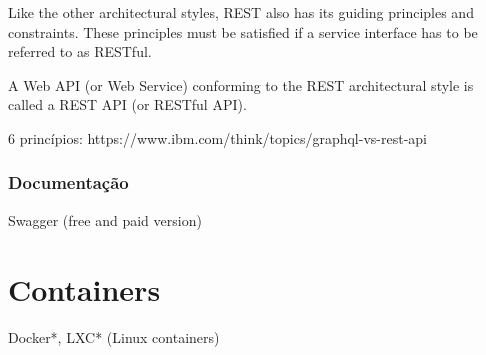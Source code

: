 Like the other architectural styles, REST also has its guiding principles and constraints. These principles must be satisfied if a service interface has to be referred to as RESTful.

A Web API (or Web Service) conforming to the REST architectural style is called a REST API (or RESTful API). 

6 princípios: https://www.ibm.com/think/topics/graphql-vs-rest-api

\subsubsection{Documentação}
Swagger (free and paid version)


\section{Containers}

Docker*, LXC* (Linux containers)





